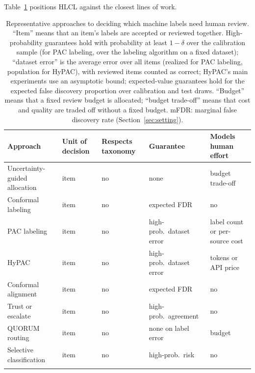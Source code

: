 \documentclass[preprint,12pt]{elsarticle}
\theoremstyle{definition}
\newcommand{\hlcl}{\textup{\textsc{HLCL}}}
\begin{document}
Table~\ref{tab:related} positions \hlcl{} against the closest lines of work.

\begin{table}[!tbp]
\centering
\footnotesize
\setlength{\tabcolsep}{3pt}
\caption{Representative approaches to deciding which machine labels need human
review. ``Item'' means that an item's labels are accepted or reviewed together.
High-probability guarantees hold with probability at least $1-\delta$ over the
calibration sample (for PAC labeling, over the labeling algorithm on a fixed dataset);
``dataset error'' is the average error over all items (realized for PAC labeling,
population for HyPAC), with reviewed items counted as correct; HyPAC's main
experiments use an asymptotic bound; expected-value guarantees hold for the expected false discovery proportion over calibration and test
draws. ``Budget'' means that a fixed review budget is allocated; ``budget
trade-off'' means that cost and quality are traded off without a fixed budget.
mFDR: marginal false discovery rate (Section~\ref{sec:setting}).}
\label{tab:related}
\begin{tabularx}{\textwidth}{>{\raggedright\arraybackslash}X >{\raggedright\arraybackslash}p{2.1cm} >{\raggedright\arraybackslash}p{1.6cm} >{\raggedright\arraybackslash}p{2.9cm} >{\raggedright\arraybackslash}p{1.5cm}}
\toprule
Approach & Unit of decision & Respects taxonomy & Guarantee & Models human effort \\
\midrule
Uncertainty-guided allocation \citep{li2023coannotating} & item & no & none & budget trade-off \\ \addlinespace[2pt]
Conformal labeling \citep{huang2025selective} & item & no & expected FDR & no \\ \addlinespace[2pt]
PAC labeling \citep{candes2026pac} & item & no & high-prob.\ dataset error & label count or per-source cost \\ \addlinespace[2pt]
HyPAC \citep{zeng2026hypac} & item & no & high-prob.\ dataset error & tokens or API price \\ \addlinespace[2pt]
Conformal alignment \citep{gui2024conformalalignment} & item & no & expected FDR & no \\ \addlinespace[2pt]
Trust or escalate \citep{jung2025trust} & item & no & high-prob.\ agreement & no \\ \addlinespace[2pt]
QUORUM routing \citep{quorum2026} & item & no & none on label error & budget \\ \addlinespace[2pt]
Selective classification \citep{geifman2017selective} & item & no & high-prob.\ risk & no \\ \addlinespace[2pt]

\end{tabularx}
\end{table}
\end{document}
